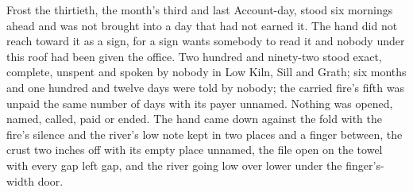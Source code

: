 Frost the thirtieth, the month's third and last Account-day, stood six mornings ahead and was not brought into a day that had not earned it. The hand did not reach toward it as a sign, for a sign wants somebody to read it and nobody under this roof had been given the office. Two hundred and ninety-two stood exact, complete, unspent and spoken by nobody in Low Kiln, Sill and Grath; six months and one hundred and twelve days were told by nobody; the carried fire's fifth was unpaid the same number of days with its payer unnamed. Nothing was opened, named, called, paid or ended. The hand came down against the fold with the fire's silence and the river's low note kept in two places and a finger between, the crust two inches off with its empty place unnamed, the file open on the towel with every gap left gap, and the river going low over lower under the finger's-width door.
